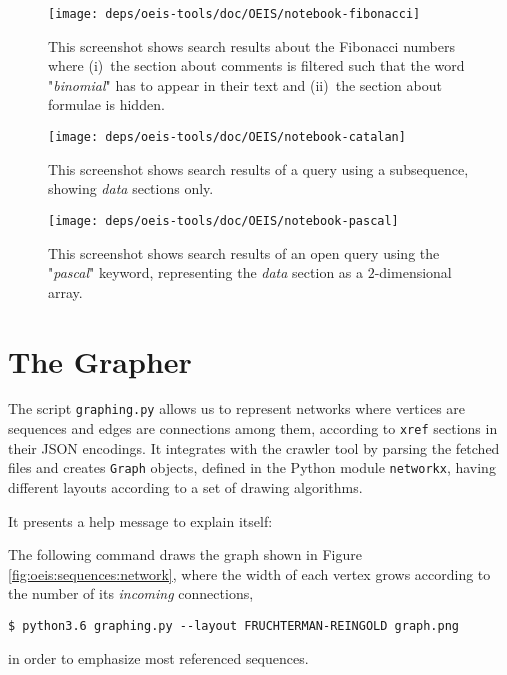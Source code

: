 \begin{figure}
\texttt{[image: deps/oeis-tools/doc/OEIS/notebook-fibonacci]}
\caption{This screenshot shows search results about the Fibonacci numbers where
(i)~the section about comments is filtered such that the word "\emph{binomial}"
has to appear in their text and (ii)~the section about formulae is hidden.}
\label{fig:oeis:notebook:fibonacci}
\end{figure}

\begin{figure}
\texttt{[image: deps/oeis-tools/doc/OEIS/notebook-catalan]}
\caption{This screenshot shows search results of a query using a subsequence,
showing \emph{data} sections only.}
\label{fig:oeis:notebook:catalan}
\end{figure}

\begin{figure}
\texttt{[image: deps/oeis-tools/doc/OEIS/notebook-pascal]}
\caption{This screenshot shows search results of an open query using the
"\emph{pascal}" keyword, representing the \emph{data} section as a
$2$-dimensional array.  }
\label{fig:oeis:notebook:pascal}
\end{figure}

\section{The Grapher}

The script \verb|graphing.py| allows us to represent networks where vertices
are sequences and edges are connections among them, according to \verb|xref|
sections in their JSON encodings. It integrates with the crawler tool by
parsing the fetched files and creates \verb|Graph| objects, defined in the
Python module \verb|networkx|, having different layouts according to a set of
drawing algorithms.

It presents a help message to explain itself:

\begin{example}
The following command draws the graph shown in Figure
\ref{fig:oeis:sequences:network}, where the width of each vertex grows
according to the number of its \textit{incoming} connections,
\begin{Verbatim}[fontsize=\small]
$ python3.6 graphing.py --layout FRUCHTERMAN-REINGOLD graph.png
\end{Verbatim}
in order to emphasize most referenced sequences.
\end{example}

